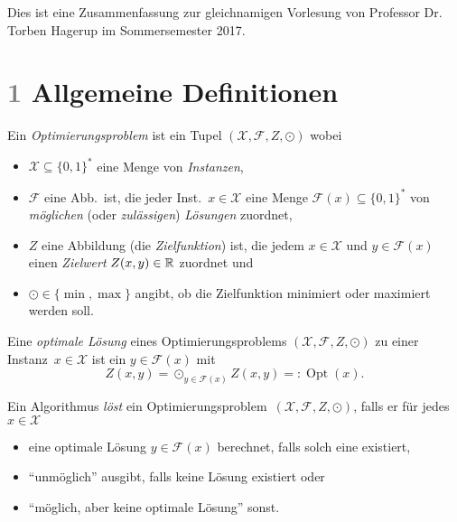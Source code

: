 \documentclass{cheat-sheet}
\newcommand{\Instances}{\mathcal{X}} %
\newcommand{\Feasible}{\mathcal{F}} %
\newcommand{\ObjFun}{Z} %
\newcommand{\Goal}{\odot} %
\newcommand{\OptTuple}{(\Instances{}, \Feasible{}, \ObjFun{}, \Goal)} %
\DeclareMathOperator{\Opt}{Opt} %
\newcommand{\scriptSection}[1]{\textcolor{gray}{#1}\enspace}
\begin{document}
\raggedcolumns %


Dies ist eine Zusammenfassung zur gleichnamigen Vorlesung von Professor Dr. Torben Hagerup im Sommersemester 2017.

\section{\scriptSection{1} Allgemeine Definitionen}




\begin{defn}
  Ein \emph{Optimierungsproblem} ist ein Tupel $\OptTuple$ wobei
  \begin{itemize}
    \item $\Instances \subseteq \{0,1\}^{*}$ eine Menge von \emph{Instanzen},
    \item $\Feasible$ eine Abb.\ ist, die jeder Inst.~$x \in \Instances$ eine Menge $\Feasible(x) \subseteq \{0,1\}^{*}$ von \emph{möglichen} (oder \textit{zulässigen}) \emph{Lösungen} zuordnet,
    \item $\ObjFun$ eine Abbildung (die \emph{Zielfunktion}) ist, die jedem $x \in \Instances$ und $y \in \Feasible(x)$ einen \textit{Zielwert} $Z(x, y) \in \mathbb{R}$ zuordnet und
    \item $\Goal \in \{ \min, \max \}$ angibt, ob die Zielfunktion minimiert oder maximiert werden soll.
  \end{itemize}
\end{defn}

\begin{defn}
  Eine \emph{optimale Lösung} eines Optimierungsproblems $\OptTuple$ zu einer Instanz~$x \in \Instances$ ist ein $y \in \Feasible(x)$ mit
  \[ \ObjFun(x, y) = \Goal_{y \in \Feasible(x)} Z(x, y) =: \Opt(x). \]
\end{defn}

\begin{defn}
  Ein Algorithmus \emph{löst} ein Optimierungsproblem~$\OptTuple$, falls er für jedes $x \in \Instances$
  \begin{itemize}
    \item eine optimale Lösung $y \in \Feasible(x)$ berechnet, falls solch eine existiert,
    \item "`unmöglich"' ausgibt, falls keine Lösung existiert oder
    \item "`möglich, aber keine optimale Lösung"' sonst.
  \end{itemize}
\end{defn}
\end{document}
